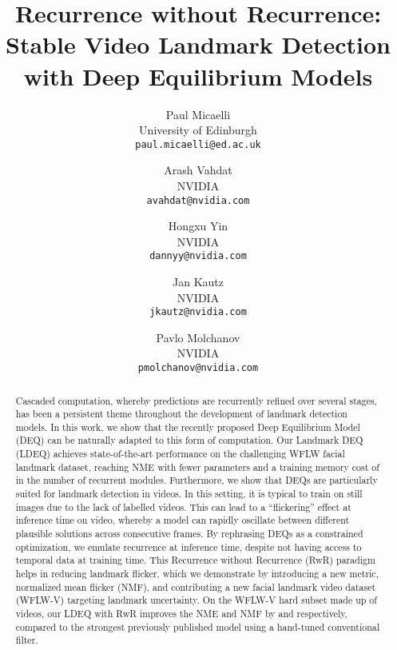 \documentclass[10pt,twocolumn,letterpaper]{article}
\begin{document}
\title{Recurrence without Recurrence: \\Stable Video Landmark Detection with Deep Equilibrium Models}

\author{Paul Micaelli\\
University of Edinburgh\\
{\tt\small paul.micaelli@ed.ac.uk}
\and
Arash Vahdat\\
NVIDIA\\
{\tt\small avahdat@nvidia.com}
\and
Hongxu Yin\\
NVIDIA\\
{\tt\small dannyy@nvidia.com}
\and
Jan Kautz\\
NVIDIA\\
{\tt\small jkautz@nvidia.com}
\and
Pavlo Molchanov\\
NVIDIA\\
{\tt\small pmolchanov@nvidia.com}
}
\maketitle

\newcommand\paul[1]{\textcolor{blue}{[Paul: #1]}}
\newcommand\JK[1]{\textcolor{magenta}{[JK: #1]}}
\newcommand\yin[1]{\textcolor{cyan}{[yin: #1]}}


\begin{abstract}

Cascaded computation, whereby predictions are recurrently refined over several stages, has been a persistent theme throughout the development of landmark detection models. In this work, we show that the recently proposed Deep Equilibrium Model (DEQ) can be naturally adapted to this form of computation. Our Landmark DEQ (LDEQ) achieves state-of-the-art performance on the challenging WFLW facial landmark dataset, reaching  NME with fewer parameters and a training memory cost of  in the number of recurrent modules. Furthermore, we show that DEQs are particularly suited for landmark detection in videos. In this setting, it is typical to train on still images due to the lack of labelled videos. This can lead to a ``flickering'' effect at inference time on video, whereby a model can rapidly oscillate between different plausible solutions across consecutive frames. By rephrasing DEQs as a constrained optimization, we emulate recurrence at inference time, despite not having access to temporal data at training time. This Recurrence without Recurrence (RwR) paradigm helps in reducing landmark flicker, which we demonstrate by introducing a new metric, normalized mean flicker (NMF), and contributing a new facial landmark video dataset (WFLW-V) targeting landmark uncertainty. On the WFLW-V hard subset made up of  videos, our LDEQ with RwR improves the NME and NMF by  and  respectively, compared to the strongest previously published model using a hand-tuned conventional filter. 

\end{abstract}
\end{document}
